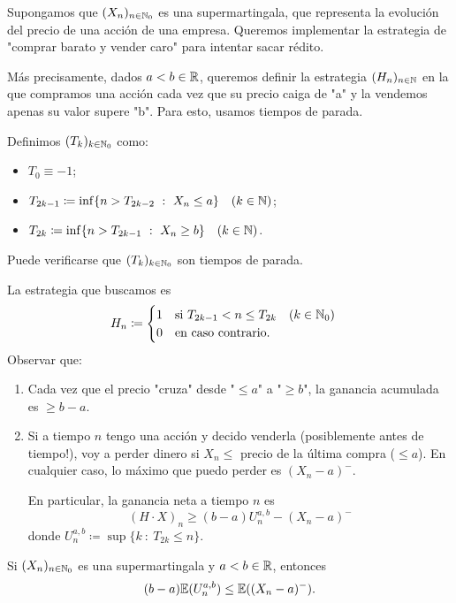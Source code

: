 
Supongamos que $(X_{n})_{n \in \mathbb{N}_{0}}$ es una supermartingala, que representa la evolución del precio de una acción de una empresa. Queremos implementar la estrategia de "comprar barato y vender caro" para intentar sacar rédito. \par 
Más precisamente, dados $a < b \in \mathbb{R}$, queremos definir la estrategia $(H_{n})_{n \in \mathbb{N}}$ en la que compramos una acción cada vez que su precio caiga de "a" y la vendemos apenas su valor supere "b". Para esto, usamos tiempos de parada. \par
Definimos $(T_{k})_{k \in \mathbb{N}_{0}}$ como:
\begin{itemize}
	\item $T_{0} \equiv -1$;

	\item $T_{2k - 1} \coloneq \inf \{n > T_{2k - 2} \ : \ X_{n} \leq a\} \quad (k \in \mathbb{N})$;

	\item $T_{2k} \coloneq \inf \{n > T_{2k - 1} \ : \ X_{n} \geq b\} \quad (k \in \mathbb{N})$. 
\end{itemize}
Puede verificarse que $(T_{k})_{k \in \mathbb{N}_{0}}$ son tiempos de parada. \par
La estrategia que buscamos es
\[ H_{n} \coloneq \begin{cases}
	1 \quad \text{si } T_{2k - 1} < n \leq T_{2k} \quad (k \in \mathbb{N}_{0}) \\
	0 \quad \text{en caso contrario.}
\end{cases} \]
Observar que:
\begin{enumerate}
	\item Cada vez que el precio "cruza" desde "$\leq a$" a "$\geq b$", la ganancia acumulada es $\geq b - a$.

	\item Si a tiempo $n$ tengo una acción y decido venderla (posiblemente antes de tiempo!), voy a perder dinero si $X_{n} \leq$ precio de la última compra ($\leq a$). En cualquier caso, lo máximo que puedo perder es $(X_{n} - a)^{-}$. \par
	En particular, la ganancia neta a tiempo $n$ es
	\[ (H \cdot X)_{n} \geq (b - a) U_{n}^{a,b} - (X_{n} - a)^{-} \]
	donde $U_{n}^{a,b} \coloneq \sup \{k \ : \ T_{2k} \leq n\}$. 
\end{enumerate}

\begin{theorem}
	Si $(X_{n})_{n \in \mathbb{N}_{0}}$ es una supermartingala y $a < b \in \mathbb{R}$, entonces
	\[ (b - a) \mathbb{E}(U_{n}^{a,b}) \leq \mathbb{E}((X_{n} - a)^{-}). \]
\end{theorem}

